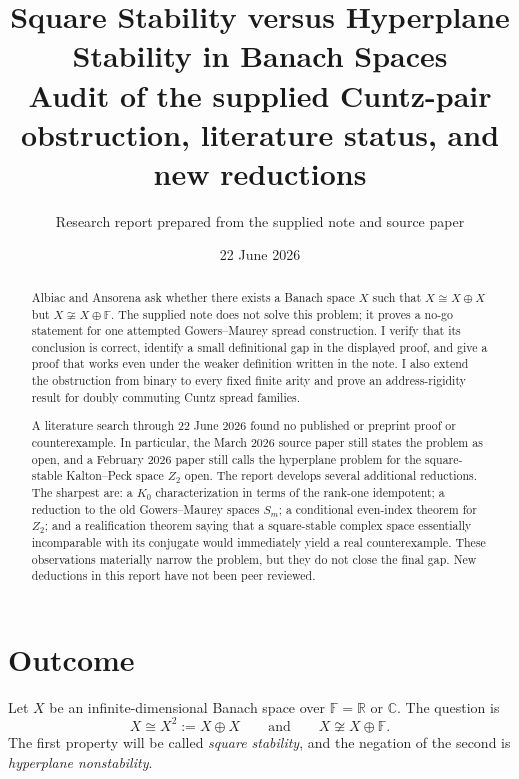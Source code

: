 \documentclass[11pt]{article}
\title{Square Stability versus Hyperplane Stability in Banach Spaces\\
\large Audit of the supplied Cuntz-pair obstruction, literature status, and new reductions}
\author{Research report prepared from the supplied note and source paper}
\date{22 June 2026}
\theoremstyle{definition}
\theoremstyle{remark}
\newcommand{\F}{\mathbb F}
\begin{document}
\maketitle

\begin{abstract}
Albiac and Ansorena ask whether there exists a Banach space $X$ such that
$X\cong X\oplus X$ but $X\not\cong X\oplus\F$.  The supplied note does not
solve this problem; it proves a no-go statement for one attempted
Gowers--Maurey spread construction.  I verify that its conclusion is correct,
identify a small definitional gap in the displayed proof, and give a proof that
works even under the weaker definition written in the note.  I also extend the
obstruction from binary to every fixed finite arity and prove an address-rigidity
result for doubly commuting Cuntz spread families.

A literature search through 22 June 2026 found no published or preprint proof or
counterexample.  In particular, the March 2026 source paper still states the
problem as open, and a February 2026 paper still calls the hyperplane problem
for the square-stable Kalton--Peck space $Z_2$ open.  The report develops several
additional reductions.  The sharpest are: a $K_0$ characterization in terms of
the rank-one idempotent; a reduction to the old Gowers--Maurey spaces $S_m$;
a conditional even-index theorem for $Z_2$; and a realification theorem saying
that a square-stable complex space essentially incomparable with its conjugate
would immediately yield a real counterexample.  These observations materially
narrow the problem, but they do not close the final gap.  New deductions in this
report have not been peer reviewed.
\end{abstract}

\tableofcontents

\section{Outcome}

Let $X$ be an infinite-dimensional Banach space over $\F=\mathbb R$ or
$\mathbb C$.  The question is
\begin{equation}\label{eq:main-question}
 X\cong X^2:=X\oplus X
 \qquad\text{and}\qquad
 X\not\cong X\oplus\F.
\end{equation}
The first property will be called \emph{square stability}, and the negation of
the second is \emph{hyperplane nonstability}.
\end{document}
